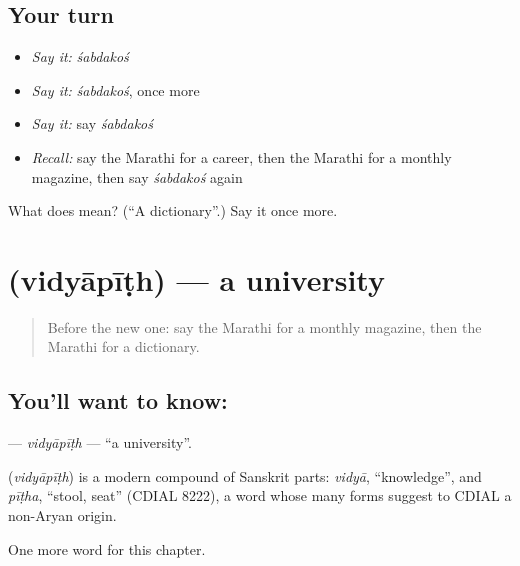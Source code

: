 \subsection*{Your turn}
\begin{itemize}
\raggedright
  \item \emph{Say it:} \emph{śabdakoś}
  \item \emph{Say it:} \emph{śabdakoś}, once more
  \item \emph{Say it:} say \emph{śabdakoś}
  \item \emph{Recall:} say the Marathi for a career, then the Marathi for a monthly magazine, then say \emph{śabdakoś} again
\end{itemize}

\begin{tcolorbox}[breakable,colback=teal!4,colframe=teal!35!black,title={Before you move on}]
What does  mean? (\textquotedblleft{}A dictionary\textquotedblright{}.) Say it once more.
\end{tcolorbox}
\section[\texorpdfstring{\mr{विद्यापीठ} (vidyāpīṭh)}{विद्यापीठ (vidyāpīṭh)}]{ (vidyāpīṭh) — a university}

\label{lesson:MR-C222-vidyapith}



\begin{quote}
Before the new one: say the Marathi for a monthly magazine, then the Marathi for a dictionary.
\end{quote}

\subsection*{You'll want to know: }
\textbf{} — \emph{vidyāpīṭh} — \textquotedblleft{}a university\textquotedblright{}.

\begin{cousinweb}
\textbf{} (\emph{vidyāpīṭh}) is a modern compound of Sanskrit parts: \emph{vidyā}, \textquotedblleft{}knowledge\textquotedblright{}, and \emph{pīṭha}, \textquotedblleft{}stool, seat\textquotedblright{} (CDIAL 8222), a word whose many forms suggest to CDIAL a non-Aryan origin.
\end{cousinweb}

\begin{grammarlens}[title={What you've built}]
One more word for this chapter.
\end{grammarlens}


